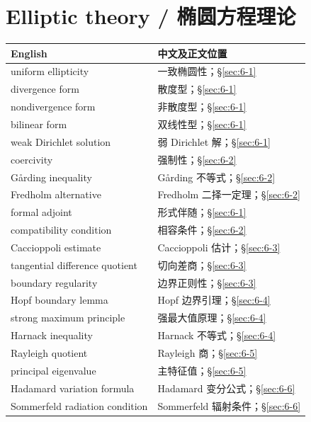 \section*{Elliptic theory / 椭圆方程理论}
\begin{center}\small
\begin{tabular}{@{}p{.53\linewidth}p{.38\linewidth}@{}}
\textbf{English}&\textbf{中文及正文位置}\\\hline
uniform ellipticity & 一致椭圆性；\S\ref{sec:6-1}\\
divergence form & 散度型；\S\ref{sec:6-1}\\
nondivergence form & 非散度型；\S\ref{sec:6-1}\\
bilinear form & 双线性型；\S\ref{sec:6-1}\\
weak Dirichlet solution & 弱 Dirichlet 解；\S\ref{sec:6-1}\\
coercivity & 强制性；\S\ref{sec:6-2}\\
G{\aa}rding inequality & G{\aa}rding 不等式；\S\ref{sec:6-2}\\
Fredholm alternative & Fredholm 二择一定理；\S\ref{sec:6-2}\\
formal adjoint & 形式伴随；\S\ref{sec:6-1}\\
compatibility condition & 相容条件；\S\ref{sec:6-2}\\
Caccioppoli estimate & Caccioppoli 估计；\S\ref{sec:6-3}\\
tangential difference quotient & 切向差商；\S\ref{sec:6-3}\\
boundary regularity & 边界正则性；\S\ref{sec:6-3}\\
Hopf boundary lemma & Hopf 边界引理；\S\ref{sec:6-4}\\
strong maximum principle & 强最大值原理；\S\ref{sec:6-4}\\
Harnack inequality & Harnack 不等式；\S\ref{sec:6-4}\\
Rayleigh quotient & Rayleigh 商；\S\ref{sec:6-5}\\
principal eigenvalue & 主特征值；\S\ref{sec:6-5}\\
Hadamard variation formula & Hadamard 变分公式；\S\ref{sec:6-6}\\
Sommerfeld radiation condition & Sommerfeld 辐射条件；\S\ref{sec:6-6}
\end{tabular}
\end{center}
\clearpage
